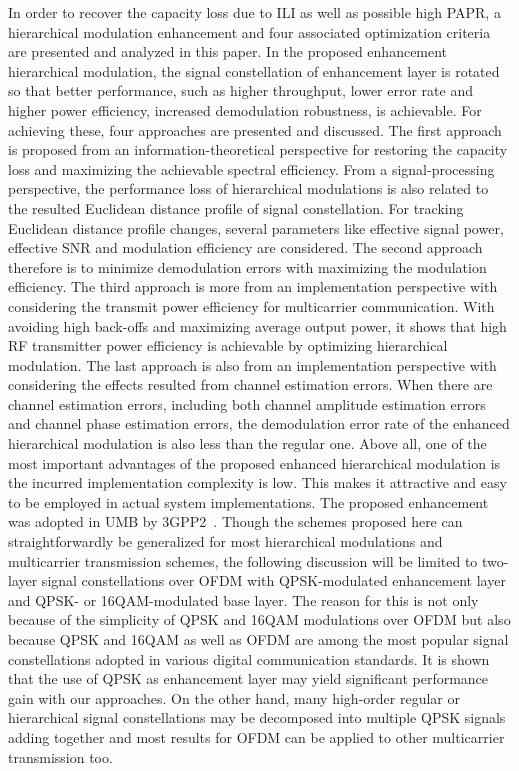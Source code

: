 \documentclass[conference]{IEEEtran}
\begin{document}
In order to recover the capacity loss due to ILI as well as
possible high PAPR, a hierarchical modulation enhancement and four
associated optimization criteria are presented and analyzed in
this paper. In the proposed enhancement hierarchical modulation,
the signal constellation of enhancement layer is rotated so that
better performance, such as higher throughput, lower error rate
and higher power efficiency, increased demodulation robustness, is
achievable. For achieving these, four approaches are presented and
discussed. The first approach is proposed from an
information-theoretical perspective for restoring the capacity
loss and maximizing the achievable spectral efficiency. From a
signal-processing perspective, the performance loss of
hierarchical modulations is also related to the resulted Euclidean
distance profile of signal constellation. For tracking Euclidean
distance profile changes, several parameters like effective signal
power, effective SNR and modulation efficiency are considered. The
second approach therefore is to minimize demodulation errors with
maximizing the modulation efficiency. The third approach is more
from an implementation perspective with considering the transmit
power efficiency for multicarrier communication. With avoiding
high back-offs and maximizing average output power, it shows that
high RF transmitter power efficiency is achievable by optimizing
hierarchical modulation. The last approach is also from an
implementation perspective with considering the effects resulted
from channel estimation errors. When there are channel estimation
errors, including both channel amplitude estimation errors and
channel phase estimation errors, the demodulation error rate of
the enhanced hierarchical modulation is also less than the regular
one. Above all, one of the most important advantages of the
proposed enhanced hierarchical modulation is the incurred
implementation complexity is low. This makes it attractive and
easy to be employed in actual system implementations. The proposed
enhancement was adopted in UMB by 3GPP2~\cite{UMB}. Though the
schemes proposed here can straightforwardly be generalized for
most hierarchical modulations and multicarrier transmission
schemes, the following discussion will be limited to two-layer
signal constellations over OFDM with QPSK-modulated enhancement
layer and QPSK- or 16QAM-modulated base layer. The reason for this
is not only because of the simplicity of QPSK and 16QAM
modulations over OFDM but also because QPSK and 16QAM as well as
OFDM are among the most popular signal constellations adopted in
various digital communication standards. It is shown that the use
of QPSK as enhancement layer may yield significant performance
gain with our approaches. On the other hand, many high-order
regular or hierarchical signal constellations may be decomposed
into multiple QPSK signals adding together and most results for
OFDM can be applied to other multicarrier transmission too.
\end{document}
